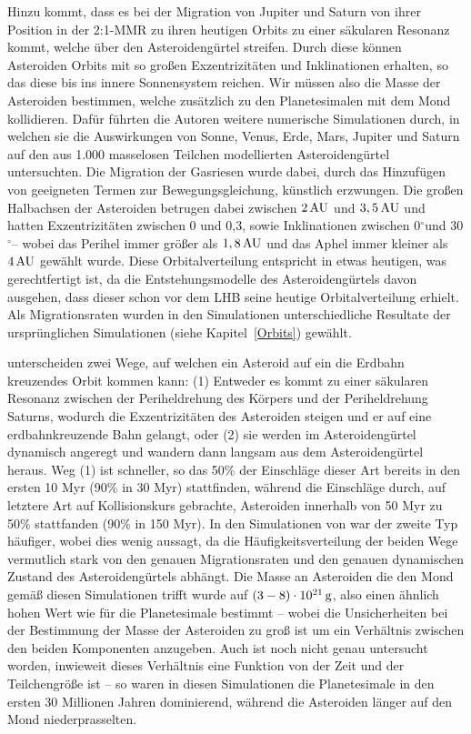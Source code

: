 \documentclass[12pt,a4paper,twoside]{article}
\renewcommand{\cite}{\citep}
\newcommand{\refsec}[1]{siehe Kapitel~\ref{#1}}
\newcommand{\degree}{$^\circ$}
\begin{document}
Hinzu kommt, dass es bei der Migration von Jupiter und Saturn von ihrer Position in der 2:1-MMR zu ihren heutigen Orbits zu einer säkularen Resonanz kommt, welche über den Asteroidengürtel streifen.
Durch diese können Asteroiden Orbits mit so großen Exzentrizitäten und Inklinationen erhalten, so das diese bis ins innere Sonnensystem reichen. Wir müssen also die Masse der Asteroiden bestimmen, welche zusätzlich zu den Planetesimalen mit dem Mond kollidieren.
Dafür führten die Autoren weitere numerische Simulationen durch, in welchen sie die Auswirkungen von Sonne, Venus, Erde, Mars, Jupiter und Saturn auf den aus 1.000 masselosen Teilchen modellierten Asteroidengürtel untersuchten.
Die Migration der Gasriesen wurde dabei, durch das Hinzufügen von geeigneten Termen zur Bewegungsgleichung, künstlich erzwungen.
Die großen Halbachsen der Asteroiden betrugen dabei zwischen $\unit[2]{AU}$ und $\unit[3,5]{AU}$ und hatten Exzentrizitäten zwischen 0 und 0,3, sowie Inklinationen zwischen 0\degree und 30\degree – wobei das Perihel immer größer als $\unit[1,8]{AU}$ und das Aphel immer kleiner als $\unit[4]{AU}$ gewählt wurde.
Diese Orbitalverteilung entspricht in etwas heutigen, was gerechtfertigt ist, da die Entstehungsmodelle des Asteroidengürtels davon ausgehen, dass dieser schon vor dem LHB seine heutige Orbitalverteilung erhielt\cite{Wetherill1992,Petit2001,Gomes2005}.
Als Migrationsraten wurden in den Simulationen unterschiedliche Resultate der ursprünglichen Simulationen (\refsec{Orbits}) gewählt.

\cite{Gomes2005} unterscheiden zwei Wege, auf welchen ein Asteroid auf ein die Erdbahn kreuzendes Orbit kommen kann: (1) Entweder es kommt zu einer säkularen Resonanz zwischen der Periheldrehung des Körpers und der Periheldrehung Saturns, wodurch die Exzentrizitäten des Asteroiden steigen und er auf eine erdbahnkreuzende Bahn gelangt, oder (2) sie werden im Asteroidengürtel dynamisch angeregt und wandern dann langsam aus dem Asteroidengürtel heraus.
Weg (1) ist schneller, so das 50\% der Einschläge dieser Art bereits in den ersten 10 Myr (90\% in 30 Myr) stattfinden, während die Einschläge durch, auf letztere Art auf Kollisionskurs gebrachte, Asteroiden innerhalb von 50 Myr zu 50\% stattfanden (90\% in 150 Myr)\cite{Gomes2005}.
In den Simulationen von \cite{Gomes2005} war der zweite Typ häufiger, wobei dies wenig aussagt, da
die Häufigkeitsverteilung der beiden Wege vermutlich stark von den genauen Migrationsraten und den genauen dynamischen Zustand des Asteroidengürtels abhängt.
Die Masse an Asteroiden die den Mond gemäß diesen Simulationen trifft wurde auf $\unit[\left( 3-8 \right) \cdot 10^{21}]{g}$, %
also einen ähnlich hohen Wert wie für die Planetesimale bestimmt – wobei die Unsicherheiten bei der Bestimmung der Masse der Asteroiden zu groß ist um ein Verhältnis zwischen den beiden Komponenten anzugeben. Auch ist noch nicht genau untersucht worden, inwieweit dieses Verhältnis eine Funktion von der Zeit und der Teilchengröße ist – so waren in diesen Simulationen die Planetesimale in den ersten 30 Millionen Jahren dominierend, während die Asteroiden länger auf den Mond niederprasselten\cite{Gomes2005}.
\end{document}
